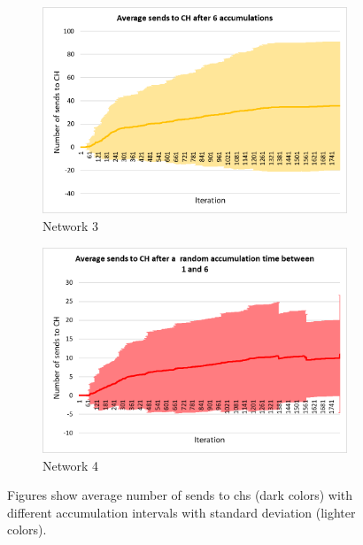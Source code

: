 \documentclass[USenglish]{uit-thesis}
\begin{document}
\begin{figure}
\begin{subfigure}[b]{0.475\textwidth}
            \includegraphics[width=\textwidth]{numSendsCh_stdev_6.png}
            \caption[]%
            {{\small Network 3}}    
            \label{fig:sendchfig3}
        \end{subfigure}
        \quad
        \begin{subfigure}[b]{0.475\textwidth}   
            \centering 
            \includegraphics[width=\textwidth]{numSendsCh_stdev_rand.png}
            \caption[]%
            {{\small Network 4}}    
            \label{fig:sendchfig4}
        \end{subfigure}
        \caption[Figures show average number of sends to \glspl{ch} with different accumulation intervals with standard deviation.]
        {\small Figures show average number of sends to \glspl{ch} (dark colors) with different accumulation intervals with standard deviation (lighter colors).} 
        \label{fig:sendschChart}
    \end{figure}
\end{document}
